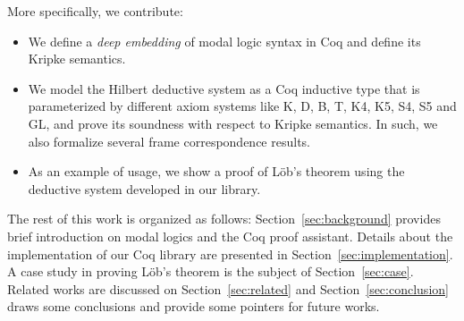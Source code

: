 \documentclass[sigconf]{acmart}
\begin{document}


More specifically, we contribute:

\begin{itemize}
  \item We define a \emph{deep embedding} of modal logic syntax in Coq and
    define its Kripke semantics.
  \item We model the Hilbert deductive system as a Coq inductive type that is
    parameterized by different axiom systems like K, D, B, T, K4, K5, S4, S5 and GL,
    and prove its soundness with respect to Kripke semantics.
    In such, we also formalize several frame correspondence results.
  \item As an example of usage, we show a proof of L\"ob's theorem using the deductive system
    developed in our library.
\end{itemize}

The rest of this work is organized as follows: Section~\ref{sec:background} provides
brief introduction on modal logics and the Coq proof assistant. Details about
the implementation of our Coq library are presented in
Section~\ref{sec:implementation}. A case study in proving L\"ob's theorem is
the subject of Section~\ref{sec:case}. Related works are discussed
on Section~\ref{sec:related} and Section~\ref{sec:conclusion} draws some conclusions and
provide some pointers for future works.
\end{document}
